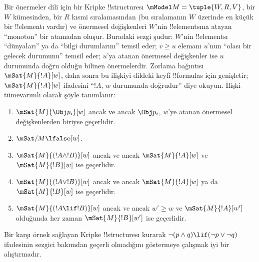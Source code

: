 \documentclass[../../../include/open-logic-section]{subfiles}
\begin{document}
Bir önermeler dili için bir Kripke !!{structure}{}sı
$\mModel M = \tuple{W, R, V}$, bir $W$ kümesinden, bir $R$ kısmi
sıralamasından (bu sıralamanın $W$ üzerinde en küçük bir !!{element}{}ı vardır) ve
önermesel değişkenleri $W$'nin !!{element}s{}ına atayan ``monoton'' bir atamadan
oluşur. Buradaki sezgi
şudur: $W$'nin !!{element}s{}ı ``dünyaları'' ya da ``bilgi durumlarını'' temsil
eder; $v \geq u$ elemanı $u$'nun ``olası bir gelecek durumunu'' temsil eder;
$u$'ya atanan önermesel değişkenler ise $u$ durumunda doğru olduğu bilinen
önermelerdir. Zorlama bağıntısı $\mSat{M}{!A}[w]$, daha sonra bu ilişkiyi
dildeki keyfî !!{formula}s için genişletir; $\mSat{M}{!A}[w]$ ifadesini
``$!A$, $w$ durumunda doğrudur'' diye okuyun. İlişki tümevarımlı olarak şöyle
tanımlanır:
\begin{enumerate}
\item $\mSat{M}{\Obj p_i}[w]$ ancak ve ancak $\Obj p_i$, $w$'ye atanan
  önermesel değişkenlerden biriyse geçerlidir.
\item $\mSat/{M}{\lfalse}[w]$.
\item $\mSat{M}{(!A \land !B)}[w]$ ancak ve ancak $\mSat{M}{!A}[w]$ ve
  $\mSat{M}{!B}[w]$ ise geçerlidir.
\item $\mSat{M}{(!A \lor !B)}[w]$ ancak ve ancak $\mSat{M}{!A}[w]$ ya da
  $\mSat{M}{!B}[w]$ ise geçerlidir.
\item $\mSat{M}{(!A \lif !B)}[w]$ ancak ve ancak $w' \geq w$ ve
  $\mSat{M}{!A}[w']$ olduğunda her zaman $\mSat{M}{!B}[w']$ ise geçerlidir.
\end{enumerate}
Bir karşı örnek sağlayan Kripke !!{structure}{}sı kurarak $\lnot (p \land q) \lif
(\lnot p \lor \lnot q)$ ifadesinin sezgici bakımdan geçerli olmadığını
göstermeye çalışmak iyi bir alıştırmadır.
\end{document}
